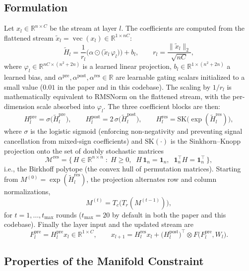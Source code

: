 \subsection{Formulation}

Let $x_l \in \mathbb{R}^{n \times C}$ be the stream at layer $l$. The
coefficients are computed from the flattened stream
$\tilde{x}_l = \operatorname{vec}(x_l) \in \mathbb{R}^{1 \times nC}$:
\[
\tilde{H}_l = \frac{1}{r_l}\Big(\alpha \odot
\big(\tilde{x}_l\, \varphi_l\big)\Big) + b_l,
\qquad r_l = \frac{\|\tilde{x}_l\|_2}{\sqrt{nC}},
\]
where $\varphi_l \in \mathbb{R}^{nC \times (n^2+2n)}$ is a learned linear
projection, $b_l \in \mathbb{R}^{1 \times (n^2+2n)}$ a learned bias, and
$\alpha^{\text{pre}}, \alpha^{\text{post}}, \alpha^{\text{res}} \in \mathbb{R}$
are learnable gating scalars initialized to a small value ($0.01$ in the paper
and in this codebase). The scaling by $1/r_l$ is mathematically equivalent to
RMSNorm on the flattened stream, with the per-dimension scale absorbed into
$\varphi_l$. The three coefficient blocks are then:
\[
H^{\text{pre}}_l = \sigma\big(\tilde{H}^{\text{pre}}_l\big),
\qquad
H^{\text{post}}_l = 2\,\sigma\big(\tilde{H}^{\text{post}}_l\big),
\qquad
H^{\text{res}}_l = \mathrm{SK}\big(\exp(\tilde{H}^{\text{res}}_l)\big),
\]
where $\sigma$ is the logistic sigmoid (enforcing non-negativity and preventing
signal cancellation from mixed-sign coefficients) and
$\mathrm{SK}(\cdot)$ is the Sinkhorn--Knopp projection onto the set of doubly
stochastic matrices
\[
\mathcal{M}^{\text{res}} = \big\{\, H \in \mathbb{R}^{n \times n} \;:\;
H \ge 0,\;\; H\,\mathbf{1}_n = \mathbf{1}_n,\;\;
\mathbf{1}_n^{\top} H = \mathbf{1}_n^{\top} \,\big\},
\]
i.e., the Birkhoff polytope (the convex hull of permutation matrices).
Starting from $M^{(0)} = \exp(\tilde{H}^{\text{res}}_l)$, the projection
alternates row and column normalizations,
\[
M^{(t)} = T_c\big(T_r(M^{(t-1)})\big),
\]
for $t = 1, \ldots, t_{\max}$ rounds ($t_{\max} = 20$ by default in both the
paper and this codebase). Finally the layer input and the updated stream are
\[
F^{\text{pre}}_l = H^{\text{pre}}_l x_l \in \mathbb{R}^{1 \times C},
\qquad
x_{l+1} = H^{\text{res}}_l x_l +
\big(H^{\text{post}}_l\big)^{\!\top} \otimes F\big(F^{\text{pre}}_l, W_l\big).
\]

\subsection{Properties of the Manifold Constraint}

